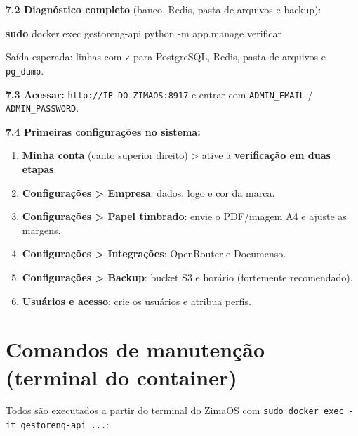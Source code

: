 \documentclass[
  10pt,
]{article}
\newenvironment{Shaded}{\begin{snugshade}}{\end{snugshade}}
\newcommand{\AttributeTok}[1]{\textcolor[rgb]{0.13,0.29,0.53}{#1}}
\newcommand{\FunctionTok}[1]{\textcolor[rgb]{0.13,0.29,0.53}{\textbf{#1}}}
\newcommand{\NormalTok}[1]{#1}
\providecommand{\tightlist}{%
  \setlength{\itemsep}{0pt}\setlength{\parskip}{0pt}}
\begin{document}
\textbf{7.2 Diagnóstico completo} (banco, Redis, pasta de arquivos e
backup):

\begin{Shaded}
\begin{Highlighting}[]
\FunctionTok{sudo}\NormalTok{ docker exec gestoreng{-}api python }\AttributeTok{{-}m}\NormalTok{ app.manage verificar}
\end{Highlighting}
\end{Shaded}

Saída esperada: linhas com \texttt{✓} para PostgreSQL, Redis, pasta de
arquivos e \texttt{pg\_dump}.

\textbf{7.3 Acessar:} \texttt{http://IP-DO-ZIMAOS:8917} e entrar com
\texttt{ADMIN\_EMAIL} / \texttt{ADMIN\_PASSWORD}.

\textbf{7.4 Primeiras configurações no sistema:}

\begin{enumerate}
\def\labelenumi{\arabic{enumi}.}
\tightlist
\item
  \textbf{Minha conta} (canto superior direito) \textgreater{} ative a
  \textbf{verificação em duas etapas}.
\item
  \textbf{Configurações \textgreater{} Empresa}: dados, logo e cor da
  marca.
\item
  \textbf{Configurações \textgreater{} Papel timbrado}: envie o
  PDF/imagem A4 e ajuste as margens.
\item
  \textbf{Configurações \textgreater{} Integrações}: OpenRouter e
  Documenso.
\item
  \textbf{Configurações \textgreater{} Backup}: bucket S3 e horário
  (fortemente recomendado).
\item
  \textbf{Usuários e acesso}: crie os usuários e atribua perfis.
\end{enumerate}

\hypertarget{comandos-de-manutenuxe7uxe3o-terminal-do-container}{%
\section{Comandos de manutenção (terminal do
container)}\label{comandos-de-manutenuxe7uxe3o-terminal-do-container}}

Todos são executados a partir do terminal do ZimaOS com
\texttt{sudo\ docker\ exec\ -it\ gestoreng-api\ ...}:
\end{document}
